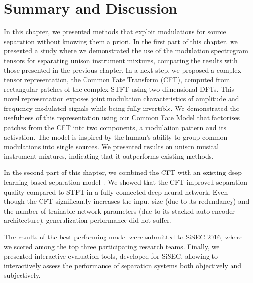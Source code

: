 \section{Summary and Discussion}

In this chapter, we presented methods that exploit modulations for source separation without knowing them a priori. 
In the first part of this chapter, we presented a study where we demonstrated the use of the modulation spectrogram tensors for separating unison instrument mixtures, comparing the results with those presented in the previous chapter.
In a next step, we proposed a complex tensor representation, the Common Fate Transform (CFT), computed from rectangular patches of the complex STFT using two-dimensional DFTs.
This novel representation exposes joint modulation characteristics of amplitude and frequency modulated signals while being fully invertible.
We demonstrated the usefulness of this representation using our Common Fate Model that factorizes patches from the CFT into two components, a modulation pattern and its activation. 
The model is inspired by the human's ability to group common modulations into single sources.
We presented results on unison musical instrument mixtures, indicating that it outperforms existing methods.
\par
In the second part of this chapter, we combined the CFT with an existing deep learning based separation model~\cite{uhlich15}.
We showed that the CFT improved separation quality compared to STFT in a fully connected deep neural network.
Even though the CFT significantly increases the input size (due to its redundancy) and the number of trainable network parameters (due to its stacked auto-encoder architecture), generalization performance did not suffer.
\par
The results of the best performing model were submitted to SiSEC 2016, where we scored among the top three participating research teams.
Finally, we presented interactive evaluation tools, developed for SiSEC, allowing to interactively assess the performance of separation systems both objectively and subjectively.
